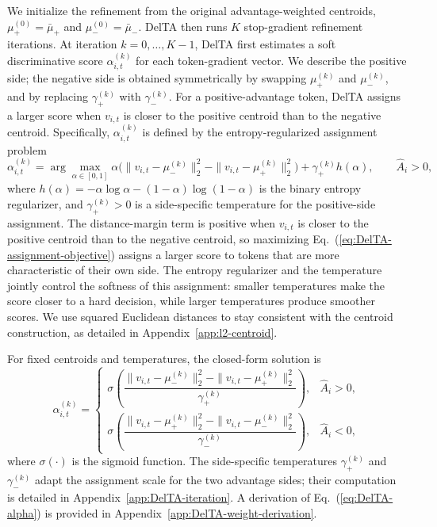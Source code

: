 \documentclass{llmxive}
\providecommand{\Eq}[1]{Eq.~(\ref{#1})}
\begin{document}
We initialize the refinement from the original advantage-weighted centroids, \(\mu_+^{(0)}=\bar\mu_+\) and \(\mu_-^{(0)}=\bar\mu_-\). 
DelTA then runs \(K\) stop-gradient refinement iterations. 
At iteration \(k=0,\dots,K-1\), DelTA first estimates a soft discriminative score \(\alpha_{i,t}^{(k)}\) for each token-gradient vector. 
We describe the positive side; the negative side is obtained symmetrically by swapping \(\mu_+^{(k)}\) and \(\mu_-^{(k)}\), and by replacing \(\gamma_+^{(k)}\) with \(\gamma_-^{(k)}\). 
For a positive-advantage token, DelTA assigns a larger score when \(v_{i,t}\) is closer to the positive centroid than to the negative centroid. 
Specifically, \(\alpha_{i,t}^{(k)}\) is defined by the entropy-regularized assignment problem
\begin{equation}
\label{eq:DelTA-assignment-objective}
\alpha_{i,t}^{(k)}
=
\arg\max_{\alpha\in[0,1]}
\alpha
\Big(
\|v_{i,t}-\mu_-^{(k)}\|_2^2
-
\|v_{i,t}-\mu_+^{(k)}\|_2^2
\Big)
+
\gamma_+^{(k)}h(\alpha),
\qquad \hat A_i>0,
\end{equation}
where \(h(\alpha)=-\alpha\log\alpha-(1-\alpha)\log(1-\alpha)\) is the binary entropy regularizer, and \(\gamma_+^{(k)}>0\) is a side-specific temperature for the positive-side assignment. 
The distance-margin term is positive when \(v_{i,t}\) is closer to the positive centroid than to the negative centroid, so maximizing \Eq{eq:DelTA-assignment-objective} assigns a larger score to tokens that are more characteristic of their own side. 
The entropy regularizer and the temperature jointly control the softness of this assignment: smaller temperatures make the score closer to a hard decision, while larger temperatures produce smoother scores. 
We use squared Euclidean distances to stay consistent with the centroid construction, as detailed in Appendix~\ref{app:l2-centroid}.

For fixed centroids and temperatures, the closed-form solution is
\begin{equation}
\label{eq:DelTA-alpha}
\alpha_{i,t}^{(k)}
=
\begin{cases}
\sigma\!\left(
\dfrac{
\|v_{i,t}-\mu_-^{(k)}\|_2^2
-
\|v_{i,t}-\mu_+^{(k)}\|_2^2
}{
\gamma_+^{(k)}
}
\right),
& \hat A_i>0,\\[1.2ex]
\sigma\!\left(
\dfrac{
\|v_{i,t}-\mu_+^{(k)}\|_2^2
-
\|v_{i,t}-\mu_-^{(k)}\|_2^2
}{
\gamma_-^{(k)}
}
\right),
& \hat A_i<0,
\end{cases}
\end{equation}
where \(\sigma(\cdot)\) is the sigmoid function. 
The side-specific temperatures \(\gamma_+^{(k)}\) and \(\gamma_-^{(k)}\) adapt the assignment scale for the two advantage sides; their computation is detailed in Appendix~\ref{app:DelTA-iteration}. 
A derivation of \Eq{eq:DelTA-alpha} is provided in Appendix~\ref{app:DelTA-weight-derivation}. 
\end{document}
